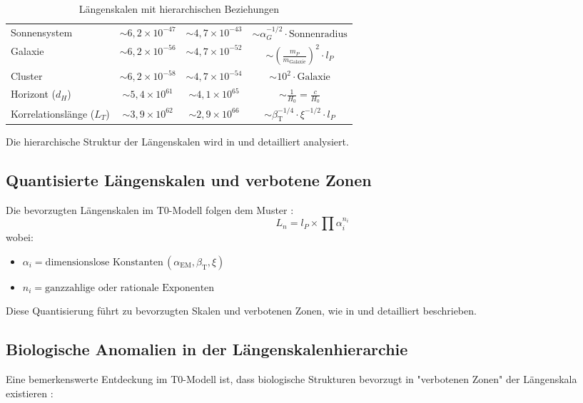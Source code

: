 \documentclass[12pt,a4paper]{article}
\newcommand{\alphaEM}{\alpha_{\text{EM}}}
\newcommand{\betaT}{\beta_{\text{T}}}
\begin{document}
\begin{table}[H]
\begin{adjustbox}{width=\textwidth}
\begin{tabular}{lccc}
			Sonnensystem & \(\sim 6,2 \times 10^{-47}\) & \(\sim 4,7 \times 10^{-43}\) & \(\sim \alpha_G^{-1/2} \cdot \text{Sonnenradius}\) \\
			Galaxie & \(\sim 6,2 \times 10^{-56}\) & \(\sim 4,7 \times 10^{-52}\) & \(\sim \left(\frac{m_P}{m_{\mathrm{Galaxie}}}\right)^2 \cdot l_P\) \\
			Cluster & \(\sim 6,2 \times 10^{-58}\) & \(\sim 4,7 \times 10^{-54}\) & \(\sim 10^2 \cdot \text{Galaxie}\) \\
			Horizont (\(d_H\)) & \(\sim 5,4 \times 10^{61}\) & \(\sim 4,1 \times 10^{65}\) & \(\sim \frac{1}{H_0} = \frac{c}{H_0}\) \\
			Korrelationslänge (\(L_T\)) & \(\sim 3,9 \times 10^{62}\) & \(\sim 2,9 \times 10^{66}\) & \(\sim \betaT^{-1/4} \cdot \xi^{-1/2} \cdot l_P\) \\
			\bottomrule
		\end{tabular}
	\end{adjustbox}
	\caption{Längenskalen mit hierarchischen Beziehungen}
	\label{tab:length_scales}
\end{table}

Die hierarchische Struktur der Längenskalen wird in \cite{pascher_galaxies_2025} und \cite{pascher_nateinhsystem_2025} detailliert analysiert.

\subsection*{Quantisierte Längenskalen und verbotene Zonen}

Die bevorzugten Längenskalen im T0-Modell folgen dem Muster \cite{pascher_planck_2025}:
\[
L_n = l_P \times \prod \alpha_i^{n_i}
\]
wobei:
\begin{itemize}
	\item \(\alpha_i = \text{dimensionslose Konstanten} \, (\alphaEM, \betaT, \xi)\)
	\item \(n_i = \text{ganzzahlige oder rationale Exponenten}\)
\end{itemize}

Diese Quantisierung führt zu bevorzugten Skalen und verbotenen Zonen, wie in \cite{pascher_planck_2025} und \cite{pascher_quantum_2025} detailliert beschrieben.

\subsection*{Biologische Anomalien in der Längenskalenhierarchie}

Eine bemerkenswerte Entdeckung im T0-Modell ist, dass biologische Strukturen bevorzugt in "verbotenen Zonen" der Längenskala existieren \cite{pascher_quantum_2025, pascher_bio_2025}:
\end{document}
